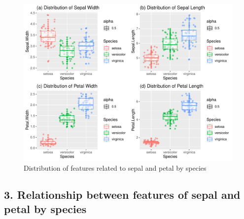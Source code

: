 \documentclass[]{article}
\begin{document}
\begin{figure}
\centering
\includegraphics{Week3Answers_files/figure-latex/unnamed-chunk-24-1.pdf}
\caption{Distribution of features related to sepal and petal by species}
\end{figure}

\newpage

\hypertarget{relationship-between-features-of-sepal-and-petal-by-species}{%
\subsection{3. Relationship between features of sepal and petal by
species}\label{relationship-between-features-of-sepal-and-petal-by-species}}
\end{document}
